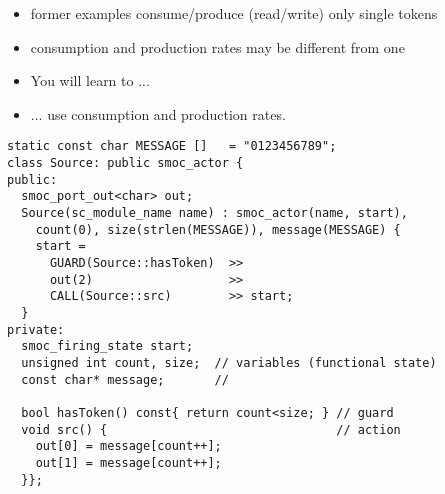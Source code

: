 \begin{frame}
\begin{itemize}
\item former examples consume/produce (read/write) only single tokens
\item consumption and production rates may be different from one
\end{itemize}
\begin{itemize}
\item You will learn to ...
\item ... use consumption and production rates.
\end{itemize}
\end{frame}




\begin{frame}[fragile=singleslide]
\begin{lstlisting}
static const char MESSAGE []   = "0123456789";
class Source: public smoc_actor {
public:
  smoc_port_out<char> out;
  Source(sc_module_name name) : smoc_actor(name, start),
    count(0), size(strlen(MESSAGE)), message(MESSAGE) {
    start = 
      GUARD(Source::hasToken)  >>
      out(2)                   >>
      CALL(Source::src)        >> start;
  }
private:
  smoc_firing_state start;
  unsigned int count, size;  // variables (functional state)
  const char* message;       //

  bool hasToken() const{ return count<size; } // guard
  void src() {                                // action
    out[0] = message[count++];
    out[1] = message[count++];
  }};
\end{lstlisting}
\end{frame}





